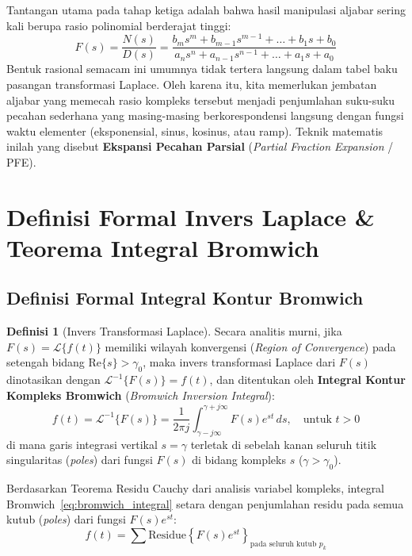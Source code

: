 \documentclass[11pt,a4paper]{article}
\theoremstyle{definition}
\newtheorem{definition}{Definisi}[section]
\begin{document}
Tantangan utama pada tahap ketiga adalah bahwa hasil manipulasi aljabar sering kali berupa rasio polinomial berderajat tinggi:
\begin{equation}
    F(s) = \frac{N(s)}{D(s)} = \frac{b_m s^m + b_{m-1}s^{m-1} + \dots + b_1 s + b_0}{a_n s^n + a_{n-1}s^{n-1} + \dots + a_1 s + a_0}
    \label{eq:rational_transfer}
\end{equation}
Bentuk rasional semacam ini umumnya tidak tertera langsung dalam tabel baku pasangan transformasi Laplace. Oleh karena itu, kita memerlukan jembatan aljabar yang memecah rasio kompleks tersebut menjadi penjumlahan suku-suku pecahan sederhana yang masing-masing berkorespondensi langsung dengan fungsi waktu elementer (eksponensial, sinus, kosinus, atau ramp). Teknik matematis inilah yang disebut \textbf{Ekspansi Pecahan Parsial} (\textit{Partial Fraction Expansion} / PFE).

\section{Definisi Formal Invers Laplace \& Teorema Integral Bromwich}

\subsection{Definisi Formal Integral Kontur Bromwich}

\begin{definition}[Invers Transformasi Laplace]
Secara analitis murni, jika $F(s) = \mathcal{L}\{f(t)\}$ memiliki wilayah konvergensi (\textit{Region of Convergence}) pada setengah bidang $\text{Re}\{s\} > \gamma_0$, maka invers transformasi Laplace dari $F(s)$ dinotasikan dengan $\mathcal{L}^{-1}\{F(s)\} = f(t)$, dan ditentukan oleh \textbf{Integral Kontur Kompleks Bromwich} (\textit{Bromwich Inversion Integral}):
\begin{equation}
    f(t) = \mathcal{L}^{-1}\{F(s)\} = \frac{1}{2\pi j} \int_{\gamma - j\infty}^{\gamma + j\infty} F(s) e^{st} \, ds, \quad \text{untuk } t > 0
    \label{eq:bromwich_integral}
\end{equation}
di mana garis integrasi vertikal $s = \gamma$ terletak di sebelah kanan seluruh titik singularitas (\textit{poles}) dari fungsi $F(s)$ di bidang kompleks $s$ ($\gamma > \gamma_0$).
\end{definition}

Berdasarkan Teorema Residu Cauchy dari analisis variabel kompleks, integral Bromwich~\eqref{eq:bromwich_integral} setara dengan penjumlahan residu pada semua kutub (\textit{poles}) dari fungsi $F(s)e^{st}$:
\begin{equation}
    f(t) = \sum \text{Residue} \left\{ F(s) e^{st} \right\}_{\text{pada seluruh kutub } p_k}
    \label{eq:cauchy_residue}
\end{equation}
\end{document}
